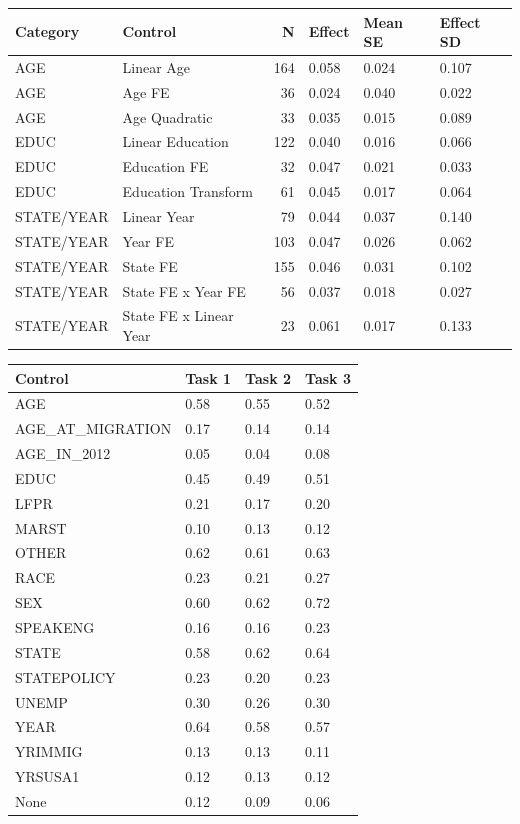 \documentclass[
  letterpaper,
  DIV=11,
  numbers=noendperiod]{scrartcl}
\begin{document}
\begin{tabular}{llrlll}
\toprule
Category & Control & N & Effect & Mean SE & Effect SD\\
\midrule
AGE & Linear Age & 164 & 0.058 & 0.024 & 0.107\\
AGE & Age FE & 36 & 0.024 & 0.040 & 0.022\\
AGE & Age Quadratic & 33 & 0.035 & 0.015 & 0.089\\
EDUC & Linear Education & 122 & 0.040 & 0.016 & 0.066\\
EDUC & Education FE & 32 & 0.047 & 0.021 & 0.033\\
\addlinespace
EDUC & Education Transform & 61 & 0.045 & 0.017 & 0.064\\
STATE/YEAR & Linear Year & 79 & 0.044 & 0.037 & 0.140\\
STATE/YEAR & Year FE & 103 & 0.047 & 0.026 & 0.062\\
STATE/YEAR & State FE & 155 & 0.046 & 0.031 & 0.102\\
STATE/YEAR & State FE x Year FE & 56 & 0.037 & 0.018 & 0.027\\
\addlinespace
STATE/YEAR & State FE x Linear Year & 23 & 0.061 & 0.017 & 0.133\\
\bottomrule
\end{tabular}

\begin{tabular}{llll}
\toprule
Control & Task 1 & Task 2 & Task 3\\
\midrule
AGE & 0.58 & 0.55 & 0.52\\
AGE\_AT\_MIGRATION & 0.17 & 0.14 & 0.14\\
AGE\_IN\_2012 & 0.05 & 0.04 & 0.08\\
EDUC & 0.45 & 0.49 & 0.51\\
LFPR & 0.21 & 0.17 & 0.20\\
\addlinespace
MARST & 0.10 & 0.13 & 0.12\\
OTHER & 0.62 & 0.61 & 0.63\\
RACE & 0.23 & 0.21 & 0.27\\
SEX & 0.60 & 0.62 & 0.72\\
SPEAKENG & 0.16 & 0.16 & 0.23\\
\addlinespace
STATE & 0.58 & 0.62 & 0.64\\
STATEPOLICY & 0.23 & 0.20 & 0.23\\
UNEMP & 0.30 & 0.26 & 0.30\\
YEAR & 0.64 & 0.58 & 0.57\\
YRIMMIG & 0.13 & 0.13 & 0.11\\
\addlinespace
YRSUSA1 & 0.12 & 0.13 & 0.12\\
None & 0.12 & 0.09 & 0.06\\
\bottomrule
\end{tabular}
\end{document}
